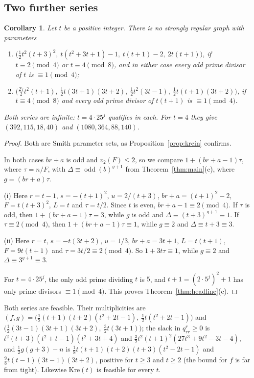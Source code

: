 \documentclass[11pt]{article}
\newtheorem{corollary}[theorem]{Corollary}
\theoremstyle{definition}
\theoremstyle{remark}
\newcommand{\odd}{\operatorname{odd}}
\newcommand{\Kre}{\mathrm{Kre}}
\begin{document}
\subsection{Two further series}
\begin{corollary}\label{cor:series}
Let $t$ be a positive integer. There is no strongly regular graph
with parameters
\begin{enumerate}[label=\textup{(\roman*)}]
\item $\bigl(\tfrac12t^2(t+3)^2,\ t(t^2+3t+1)-1,\ t(t+1)-2,\ 2t(t+1)\bigr)$, if
$t\equiv2\pmod 4$ or $t\equiv4\pmod8$, and in either case every odd prime divisor of $t$ is
$\equiv1\pmod 4$;
\item $\bigl(\tfrac{27}{2}t^2(t+1),\ \tfrac12t(3t+1)(3t+2),\
\tfrac12t^2(3t-1),\ \tfrac12t(t+1)(3t+2)\bigr)$, if $t\equiv4\pmod8$ and every
odd prime divisor of $t(t+1)$ is $\equiv1\pmod 4$.
\end{enumerate}
Both series are infinite: $t=4\cdot25^j$ qualifies in each. For $t=4$ they
give $(392,115,18,40)$ and $(1080,364,88,140)$.
\end{corollary}

\begin{proof}
Both are Smith parameter sets, as Proposition~\ref{prop:krein} confirms.

In both cases $br+a$ is odd and $v_2(F)\le2$, so we compare
$1+(br+a-1)\tau$, where $\tau=n/F$, with $\Delta\equiv\odd(b)^{g+1}$ from
Theorem~\ref{thm:main}(c), where $g=(br+a)\tau$.

(i) Here $r=t-1$, $s=-(t+1)^2$, $u=2/(t+3)$, $br+a=(t+1)^2-2$,
$F=t(t+3)^2$, $L=t$ and $\tau=t/2$. Since $t$ is even, $br+a-1\equiv2\pmod 4$.
If $\tau$ is odd, then $1+(br+a-1)\tau\equiv3$, while $g$ is odd and
$\Delta\equiv(t+3)^{g+1}\equiv1$. If $\tau\equiv2\pmod 4$, then
$1+(br+a-1)\tau\equiv1$, while $g\equiv2$ and $\Delta\equiv t+3\equiv3$.

(ii) Here $r=t$, $s=-t(3t+2)$, $u=1/3$, $br+a=3t+1$, $L=t(t+1)$,
$F=9t(t+1)$ and $\tau=3t/2\equiv2\pmod 4$. So $1+3t\tau\equiv1$, while
$g\equiv2$ and $\Delta\equiv3^{g+1}\equiv3$.

For $t=4\cdot25^j$, the only odd prime dividing $t$ is $5$, and
$t+1=(2\cdot5^j)^2+1$ has only prime divisors $\equiv1\pmod 4$. This proves
Theorem~\ref{thm:headline}(c).
\end{proof}

Both series are feasible. Their multiplicities are
$(f,g)=\bigl(\tfrac12(t+1)(t+2)(t^2+2t-1),\ \tfrac12t(t^2+2t-1)\bigr)$ and
$\bigl(\tfrac12(3t-1)(3t+1)(3t+2),\ \tfrac32t(3t+1)\bigr)$; the slack in
$q^r_{rr}\ge0$ is $t^2(t+3)(t^2+t-1)(t^2+3t+4)$ and
$\tfrac32t^2(t+1)^2(27t^3+9t^2-3t-4)$, and $\tfrac12g(g+3)-n$ is
$\tfrac18t(t+1)(t+2)(t+3)(t^2-2t-1)$ and $\tfrac98t(t-1)(3t-1)(3t+2)$,
positive for $t\ge3$ and $t\ge2$ (the bound for $f$ is far from tight).
Likewise $\Kre(t)$ is feasible for every $t$.
\end{document}
